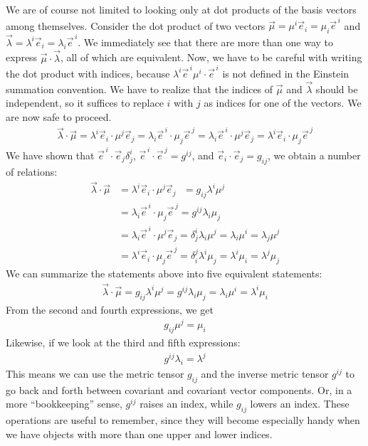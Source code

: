 \documentclass{article}
\theoremstyle{definition}
\begin{document}
We are of course not limited to looking only at dot products of the basis vectors among themselves. Consider the dot product of two vectors $\vec{\mu} = \mu^i\vec{e}_i=\mu_i\vec{e}^{\,i}$ and $\vec{\lambda} = \lambda^i\vec{e}_i = \lambda_i\vec{e}^{\,i}$. We immediately see that there are more than one way to express $\vec{\mu}\cdot\vec{\lambda}$, all of which are equivalent. Now, we have to be careful with writing the dot product with indices, because $\lambda^i\vec{e}^{\,i}\mu^i\cdot\vec{e}^{\,i}$ is not defined in the Einstein summation convention. We have to realize that the indices of $\vec{\mu}$ and $\vec{\lambda}$ should be independent, so it suffices to replace $i$ with $j$ as indices for one of the vectors. We are now safe to proceed. 
\begin{align*}
\boxed{
\vec{\lambda}\cdot\vec{\mu} = \lambda^i\vec{e}_i\cdot\mu^j\vec{e}_j = \lambda_i\vec{e}^{\,i}\cdot\mu_j\vec{e}^{\,j} = \lambda_i\vec{e}^{\,i}\cdot\mu^j\vec{e}_j = \lambda^i\vec{e}_{i}\cdot\mu_j\vec{e}^{\,j}
}
\end{align*}
We have shown that $\vec{e}^{\,i}\cdot\vec{e}_j \delta^i_j$, $\vec{e}^{\,i}\cdot\vec{e}^{\,j} = g^{ij}$, and $\vec{e}_i\cdot\vec{e}_j = g_{ij}$, we obtain a number of relations:
\begin{align*}
\vec{\lambda}\cdot\vec{\mu} &= \lambda^i\vec{e}_i\cdot\mu^j\vec{e}_j \text{ }= g_{ij}\lambda^i\mu^j \nonumber\\
 &= \lambda_i\vec{e}^{\,i}\cdot\mu_j\vec{e}^{\,j} = g^{ij}\lambda_i\mu_j \nonumber\\
 &= \lambda_i\vec{e}^{\,i}\cdot\mu^j\vec{e}_j = \delta^i_j\lambda_i \mu^j = \lambda_i\mu^i = \lambda_j\mu^j \nonumber \\
 &= \lambda^i\vec{e}_{i}\cdot\mu_j\vec{e}^{\,j} = \delta^j_i\lambda^i \mu_j = \lambda^i\mu_i = \lambda^j\mu_j \nonumber
\end{align*}
We can summarize the statements above into five equivalent statements:
\begin{align*}
\boxed{\vec{\lambda}\cdot\vec{\mu} = g_{ij}\lambda^i\mu^j = g^{ij}\lambda_i\mu_j = \lambda_i\mu^i = \lambda^i\mu_i}
\end{align*}
From the second and fourth expressions, we get
\begin{align*}
\boxed{g_{ij}\mu^j = \mu_i}
\end{align*}
Likewise, if we look at the third and fifth expressions:
\begin{align*}
\boxed{g^{ij}\lambda_i = \lambda^j}
\end{align*}
This means we can use the metric tensor $g_{ij}$ and the inverse metric tensor $g^{ij}$ to go back and forth between covariant and covariant vector components. Or, in a more ``bookkeeping'' sense, $g^{ij}$ raises an index, while $g_{ij}$ lowers an index. These operations are useful to remember, since they will become especially handy when we have objects with more than one upper and lower indices. \\
\end{document}
